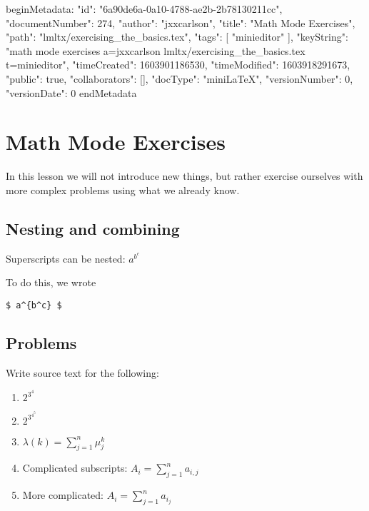 beginMetadata:
{
    "id": "6a90de6a-0a10-4788-ae2b-2b78130211cc",
    "documentNumber": 274,
    "author": "jxxcarlson",
    "title": "Math Mode Exercises",
    "path": "lmltx/exercising_the_basics.tex",
    "tags": [
        "minieditor"
    ],
    "keyString": "math mode exercises a=jxxcarlson lmltx/exercising_the_basics.tex t=minieditor",
    "timeCreated": 1603901186530,
    "timeModified": 1603918291673,
    "public": true,
    "collaborators": [],
    "docType": "miniLaTeX",
    "versionNumber": 0,
    "versionDate": 0
}
endMetadata

\setcounter{section}{2}

\section{Math Mode Exercises}

\innertableofcontents


In this lesson we will not introduce new things, but rather exercise ourselves with more complex problems using what we already know.


\subsection{Nesting and combining}

Superscripts can be nested: $a^{b^c}$

To do this, we wrote 

\begin{verbatim}
$ a^{b^c} $
\end{verbatim}

\subsection*{Problems}

Write source text for the following:

\begin{enumerate}

\item $2^{3^4}$

\item $2^{3^{4^5}}$

\item $\lambda(k) = \sum_{j=1}^n \mu_j^k$

\item Complicated subscripts: $ A_i = \sum_{j=1}^n a_{i,j}  $

\item More complicated: $ A_i = \sum_{j=1}^n a_{i_j}  $

\end{enumerate}

